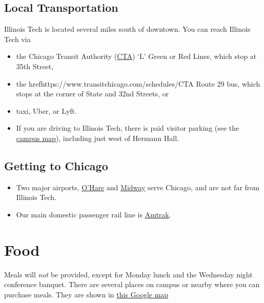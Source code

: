 \documentclass[12pt,lettersize,oneside]{book} %
\begin{document}
\subsection{Local Transportation}
Illinois Tech is located several miles south of downtown.  You  can reach Illinois Tech via
\begin{itemize}
	\item the Chicago Transit Authority (\href{https://www.transitchicago.com/schedules/}{CTA}) `L' Green or Red Lines, which stop at 35th Street,
	\item the href{https://www.transitchicago.com/schedules/}{CTA} Route 29 bus, which stops at the corner of State and 32nd Streets, or
	\item taxi, Uber, or Lyft.
	 \item If you are driving to Illinois Tech, there is paid visitor parking (see the \href{https://www.iit.edu/sites/default/files/2022-08/mies-campus-accessibility-map-2022.pdf}{campus map}), including just west of Hermann Hall.
\end{itemize}

\subsection{Getting to Chicago}

\begin{itemize}
  \item Two major airports, \href{https://www.flychicago.com/ohare/home/Pages/default.aspx}{O'Hare} and \href{https://www.flychicago.com/midway/pages/default.aspx}{Midway} serve Chicago, and are not far from Illinois Tech.
  \item Our main domestic passenger rail line is \href{https://www.amtrak.com/home.html}{Amtrak}.
\end{itemize}


\section{Food}

Meals will \emph{not} be provided, except for Monday lunch and the Wednesday night conference banquet. There are several places on campus or nearby where you can purchase meals.  They are shown in \href{https://www.google.com/maps/d/u/1/edit?mid=1QH5guZDg-m8_f1oO9HgZ5sIL76q1gdk&usp=sharing}{this Google map}
\end{document}
